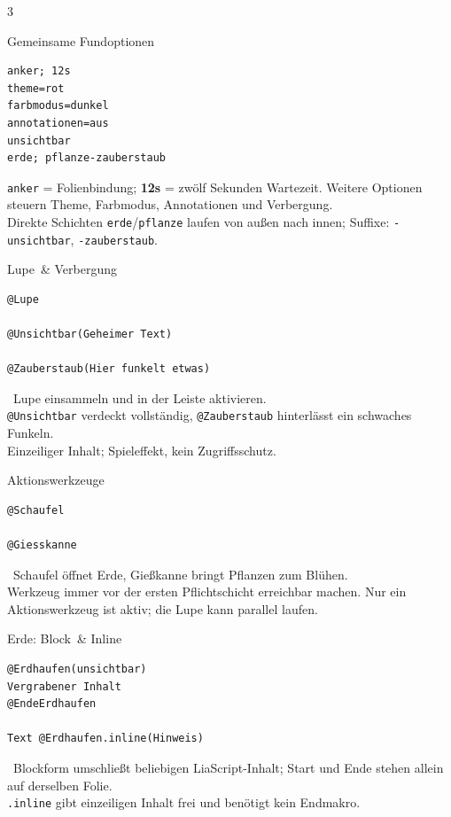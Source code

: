 \documentclass[a4paper,landscape,9pt]{extarticle}
\newcommand{\prevsm}[1]{{\footnotesize\color{muted} #1}}
\newcommand{\lootval}[1]{{\ttfamily\bfseries\color{lootteal}#1}}
\begin{document}
\begin{multicols}{3}
\begin{lootcard}{Gemeinsame Fundoptionen}
\begin{lstlisting}[language=lia]
anker; 12s
theme=rot
farbmodus=dunkel
annotationen=aus
unsichtbar
erde; pflanze-zauberstaub
\end{lstlisting}
\tcblower
\prevsm{\texttt{anker} = Folienbindung; \lootval{12s} = zwölf Sekunden Wartezeit. Weitere Optionen steuern Theme, Farbmodus, Annotationen und Verbergung.\\[2pt]
Direkte Schichten \texttt{erde}/\texttt{pflanze} laufen von außen nach innen; Suffixe: \texttt{-unsichtbar}, \texttt{-zauberstaub}.}
\end{lootcard}

\columnbreak

\begin{lootcard}{Lupe \,\& Verbergung}
\begin{lstlisting}[language=lia]
@Lupe

@Unsichtbar(Geheimer Text)

@Zauberstaub(Hier funkelt etwas)
\end{lstlisting}
\tcblower
\prevsm{\faSearch~Lupe einsammeln und in der Leiste aktivieren.\\[2pt]
\texttt{@Unsichtbar} verdeckt vollständig, \texttt{@Zauberstaub} hinterlässt ein schwaches Funkeln.\\[2pt]
{\footnotesize Einzeiliger Inhalt; Spieleffekt, kein Zugriffsschutz.}}
\end{lootcard}

\begin{lootcard}{Aktionswerkzeuge}
\begin{lstlisting}[language=lia]
@Schaufel

@Giesskanne
\end{lstlisting}
\tcblower
\prevsm{\faPuzzlePiece~Schaufel öffnet Erde, Gießkanne bringt Pflanzen zum Blühen.\\[2pt]
Werkzeug immer vor der ersten Pflichtschicht erreichbar machen. Nur ein Aktionswerkzeug ist aktiv; die Lupe kann parallel laufen.}
\end{lootcard}

\begin{lootcard}{Erde: Block \,\& Inline}
\begin{lstlisting}[language=lia]
@Erdhaufen(unsichtbar)
Vergrabener Inhalt
@EndeErdhaufen

Text @Erdhaufen.inline(Hinweis)
\end{lstlisting}
\tcblower
\prevsm{\faEye~Blockform umschließt beliebigen LiaScript-Inhalt; Start und Ende stehen allein auf derselben Folie.\\[2pt]
\texttt{.inline} gibt einzeiligen Inhalt frei und benötigt kein Endmakro.}
\end{lootcard}


\end{multicols}
\end{document}

